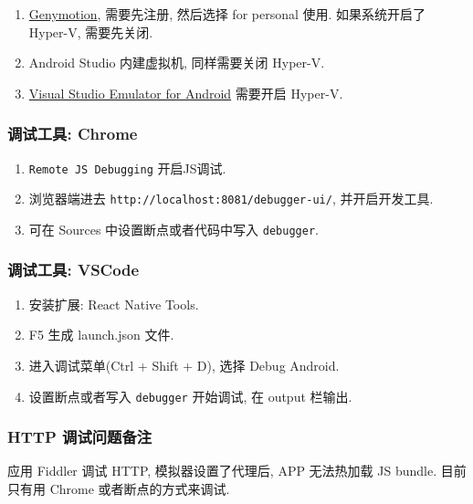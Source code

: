 \begin{enumerate}
\def\labelenumi{\arabic{enumi}.}
\tightlist
\item
  \href{https://www.genymotion.com/download/}{Genymotion}, 需要先注册,
  然后选择 for personal 使用. 如果系统开启了 Hyper-V, 需要先关闭.
\item
  Android Studio 内建虚拟机, 同样需要关闭 Hyper-V.
\item
  \href{https://www.visualstudio.com/vs/msft-android-emulator/}{Visual
  Studio Emulator for Android} 需要开启 Hyper-V.
\end{enumerate}

\subsubsection{调试工具: Chrome}\label{ux8c03ux8bd5ux5de5ux5177-chrome}

\begin{enumerate}
\def\labelenumi{\arabic{enumi}.}
\tightlist
\item
  \lstinline!Remote JS Debugging! 开启JS调试.
\item
  浏览器端进去 \lstinline!http://localhost:8081/debugger-ui/!,
  并开启开发工具.
\item
  可在 Sources 中设置断点或者代码中写入 \lstinline!debugger!.
\end{enumerate}

\subsubsection{调试工具: VSCode}\label{ux8c03ux8bd5ux5de5ux5177-vscode}

\begin{enumerate}
\def\labelenumi{\arabic{enumi}.}
\tightlist
\item
  安装扩展: React Native Tools.
\item
  F5 生成 launch.json 文件.
\item
  进入调试菜单(Ctrl + Shift + D), 选择 Debug Android.
\item
  设置断点或者写入 \lstinline!debugger! 开始调试, 在 output 栏输出.
\end{enumerate}

\subsubsection{HTTP
调试问题备注}\label{http-ux8c03ux8bd5ux95eeux9898ux5907ux6ce8}

应用 Fiddler 调试 HTTP, 模拟器设置了代理后, APP 无法热加载 JS bundle.
目前只有用 Chrome 或者断点的方式来调试.

